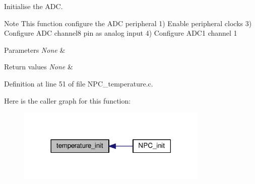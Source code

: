 Initialise the A\+DC. 

\begin{DoxyNote}{Note}
This function configure the A\+DC peripheral 1) Enable peripheral clocks 3) Configure A\+DC channel8 pin as analog input 4) Configure A\+D\+C1 channel 1 
\end{DoxyNote}

\begin{DoxyParams}{Parameters}
{\em None} & \\
\hline
\end{DoxyParams}

\begin{DoxyRetVals}{Return values}
{\em None} & \\
\hline
\end{DoxyRetVals}


Definition at line 51 of file N\+P\+C\+\_\+temperature.\+c.



Here is the caller graph for this function\+:\nopagebreak
\begin{figure}[H]
\begin{center}
\leavevmode
\includegraphics[width=258pt]{d6/dca/group___temperature___init_ga7da890f6748bbeb05511fd20100cb6ef_icgraph}
\end{center}
\end{figure}


